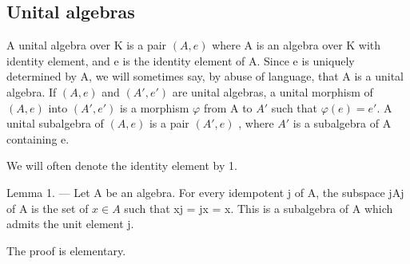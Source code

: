 \subsection{Unital algebras}

A unital algebra over K is a pair \((A,e)\) where A is an algebra over K with identity element, and e is the identity element of A. Since e is uniquely determined by A, we will sometimes say, by abuse of language, that A is a unital algebra. If \((A,e)\) and \((A',e')\) are unital algebras, a unital morphism of \((A,e)\) into \((A',e')\) is a morphism \(\varphi\) from A to \(A'\) such that \(\varphi(e)=e'\). A unital subalgebra of \((A,e)\) is a pair \((A',e)\) , where \(A'\) is a subalgebra of A containing e.

We will often denote the identity element by 1.

Lemma 1. --- Let A be an algebra. For every idempotent j of A, the subspace jAj of A is the set of \(x \in A\) such that xj = jx = x. This is a subalgebra of A which admits the unit element j.

The proof is elementary.

